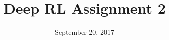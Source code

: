 \documentclass{mwhittaker}
\title{Deep RL Assignment 2}
\date{September 20, 2017}
\begin{document}
\maketitle

{}
\clearpage
{}
\clearpage
{}
\end{document}
